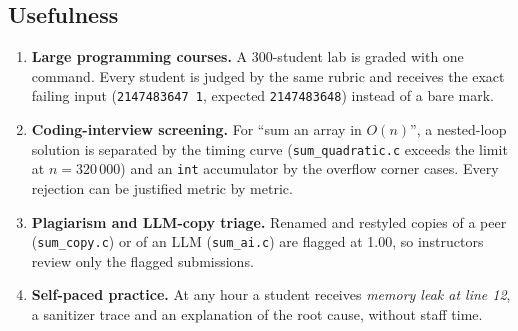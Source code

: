 \documentclass[11pt,a4paper]{article}
\newcommand{\file}[1]{\nolinkurl{#1}}
\begin{document}
\subsection{Usefulness}
\begin{enumerate}
  \item \textbf{Large programming courses.} A 300-student lab is graded with one command. Every student is judged by the
        same rubric and receives the exact failing input (\texttt{2147483647 1}, expected \texttt{2147483648}) instead of a
        bare mark.
  \item \textbf{Coding-interview screening.} For ``sum an array in $O(n)$'', a nested-loop solution is separated by the
        timing curve (\file{sum_quadratic.c} exceeds the limit at $n = 320\,000$) and an \texttt{int} accumulator by the
        overflow corner cases. Every rejection can be justified metric by metric.
  \item \textbf{Plagiarism and LLM-copy triage.} Renamed and restyled copies of a peer (\file{sum_copy.c}) or of an LLM
        (\file{sum_ai.c}) are flagged at 1.00, so instructors review only the flagged submissions.
  \item \textbf{Self-paced practice.} At any hour a student receives \emph{memory leak at line 12}, a sanitizer trace and
        an explanation of the root cause, without staff time.
\end{enumerate}
\end{document}
